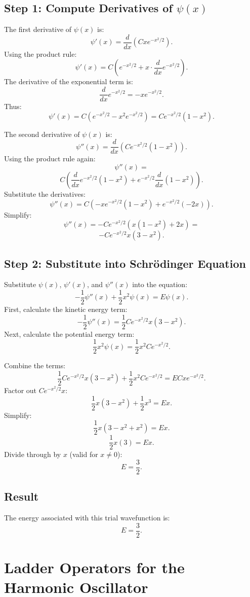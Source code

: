 \documentclass[a4paper,12pt]{article}
\begin{document}
\begin{multicols}{2}
\subsection*{Step 1: Compute Derivatives of \( \psi(x) \)}
The first derivative of \( \psi(x) \) is:
\[
\psi'(x) = \frac{d}{dx} \left(Cx e^{-x^2 / 2}\right).
\]
Using the product rule:
\[
\psi'(x) = C \left(e^{-x^2 / 2} + x \cdot \frac{d}{dx} e^{-x^2 / 2}\right).
\]
The derivative of the exponential term is:
\[
\frac{d}{dx} e^{-x^2 / 2} = -x e^{-x^2 / 2}.
\]
Thus:
\[
\psi'(x) = C \left(e^{-x^2 / 2} - x^2 e^{-x^2 / 2}\right) = C e^{-x^2 / 2} (1 - x^2).
\]

The second derivative of \( \psi(x) \) is:
\[
\psi''(x) = \frac{d}{dx} \left(C e^{-x^2 / 2} (1 - x^2)\right).
\]
Using the product rule again:
\[
\psi''(x) = 
\]
\[
C \left(\frac{d}{dx} e^{-x^2 / 2} (1 - x^2) + e^{-x^2 / 2} \frac{d}{dx} (1 - x^2)\right).
\]
Substitute the derivatives:
\[
\psi''(x) = C \left(-x e^{-x^2 / 2} (1 - x^2) + e^{-x^2 / 2} (-2x)\right).
\]
Simplify:
\[
\psi''(x) = -C e^{-x^2 / 2} \left(x (1 - x^2) + 2x\right) = 
\]
\[
-C e^{-x^2 / 2} x (3 - x^2).
\]

\subsection*{Step 2: Substitute into Schrödinger Equation}
Substitute \( \psi(x) \), \( \psi'(x) \), and \( \psi''(x) \) into the equation:
\[
-\frac{1}{2} \psi''(x) + \frac{1}{2} x^2 \psi(x) = E \psi(x).
\]
First, calculate the kinetic energy term:
\[
-\frac{1}{2} \psi''(x) = \frac{1}{2} C e^{-x^2 / 2} x (3 - x^2).
\]
Next, calculate the potential energy term:
\[
\frac{1}{2} x^2 \psi(x) = \frac{1}{2} x^2 C e^{-x^2 / 2}.
\]

Combine the terms:
\[
\frac{1}{2} C e^{-x^2 / 2} x (3 - x^2) + \frac{1}{2} x^2 C e^{-x^2 / 2} = E C x e^{-x^2 / 2}.
\]
Factor out \( C e^{-x^2 / 2} x \):
\[
\frac{1}{2} x (3 - x^2) + \frac{1}{2} x^3 = E x.
\]
Simplify:
\[
\frac{1}{2} x (3 - x^2 + x^2) = E x.
\]
\[
\frac{1}{2} x (3) = E x.
\]
Divide through by \( x \) (valid for \( x \neq 0 \)):
\[
E = \frac{3}{2}.
\]

\subsection*{Result}
The energy associated with this trial wavefunction is:
\[
E = \frac{3}{2}.
\]

\section{Ladder Operators for the Harmonic Oscillator}


\end{multicols}
\end{document}
